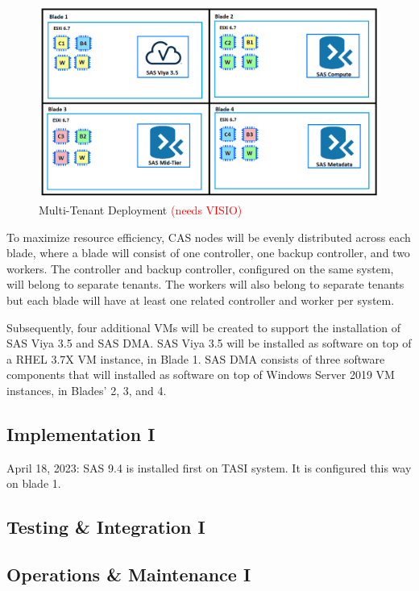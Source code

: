 \begin{figure}[H]
    \centering
    \includegraphics[scale = 0.52]{images/initial-deployment-diagram.png}
    \caption{Multi-Tenant Deployment \textcolor{red}{(needs VISIO)} }
    \label{Initial Multi-Tenant Deployment}
\end{figure} 

To maximize resource efficiency, CAS nodes will be evenly distributed across each blade, where a blade will consist of one controller, one backup controller, and two workers. The controller and backup controller, configured on the same system, will belong to separate tenants. The workers will also belong to separate tenants but each blade will have at least one related controller and worker per system. 

Subsequently, four additional VMs will be created to support the installation of SAS Viya 3.5 and SAS DMA. SAS Viya 3.5 will be installed as software on top of a RHEL 3.7X VM instance, in Blade 1. SAS DMA consists of three software components that will installed as software on top of Windows Server 2019 VM instances, in Blades' 2, 3, and 4. 

\subsection{Implementation I}

April 18, 2023:
SAS 9.4 is installed first on TASI system. It is configured this way on blade 1. 


\subsection{Testing \& Integration I}


\subsection{Operations \& Maintenance I}